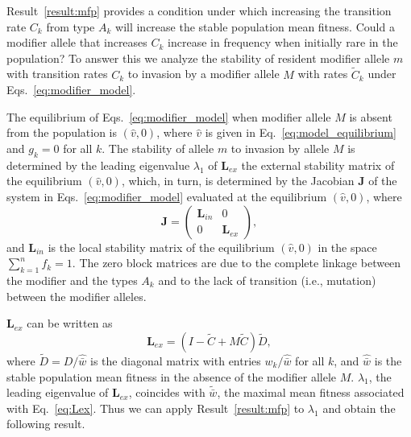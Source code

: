\documentclass[12pt, twocolumn]{extarticle}
\newcommand{\cl}{\mathbf{L}}
\newcommand{\cj}{\mathbf{J}}
\begin{document}
Result~\ref{result:mfp} provides a condition under which increasing the transition rate $C_k$ from type $A_k$ will increase the stable population mean fitness.
Could a modifier allele that increases $C_k$ increase in frequency when initially rare in the population?
To answer this we analyze the stability of resident modifier allele $m$ with transition rates $C_k$ to  invasion by a modifier allele $M$ with rates $\tilde{C}_k$ under Eqs.~\ref{eq:modifier_model}.

The equilibrium of Eqs.~\ref{eq:modifier_model} when modifier allele $M$ is absent from the population is $(\hat v,0)$, where $\hat v$ is given in Eq.~\ref{eq:model_equilibrium} and $g_k=0$ for all $k$. 
The stability of allele $m$ to invasion by allele $M$ is determined by the leading eigenvalue $\lambda_1$ of $\cl_{ex}$ the external stability matrix of the equilibrium $(\hat v,0)$, which, in turn, is determined by the Jacobian $\cj$ of the system in Eqs.~\ref{eq:modifier_model} evaluated at the equilibrium $(\hat v,0)$, where
\begin{equation}
\cj = \begin{pmatrix}\cl_{in} & 0 \\ 0 & \cl_{ex} \end{pmatrix},
\end{equation}
and $\cl_{in}$ is the local stability matrix of the equilibrium $(\hat v,0)$ in the space $\sum_{k=1}^n{f_k}=1$.
The zero block matrices are due to the complete linkage between the modifier and the types $A_k$ and to the lack of transition (i.e., mutation) between the modifier alleles.

$\cl_{ex}$ can be written as
\begin{equation}\label{eq:Lex}
\cl_{ex} = (I - \tilde{C} + M \tilde{C}) \tilde{D} ,
\end{equation}
where $\tilde{D} =D/\hat{\bar{w}}$ is the diagonal matrix with entries $w_k/\hat{\bar{w}}$ for all $k$, and $\hat{\bar{w}}$ is the stable population mean fitness in the absence of the modifier allele $M$.
$\lambda_1$, the leading eigenvalue of $\cl_{ex}$, coincides with $\tilde{\bar{w}}$, the maximal mean fitness associated with Eq.~\ref{eq:Lex}.
Thus we can apply Result~\ref{result:mfp} to $\lambda_1$ and obtain the following result.
\end{document}
